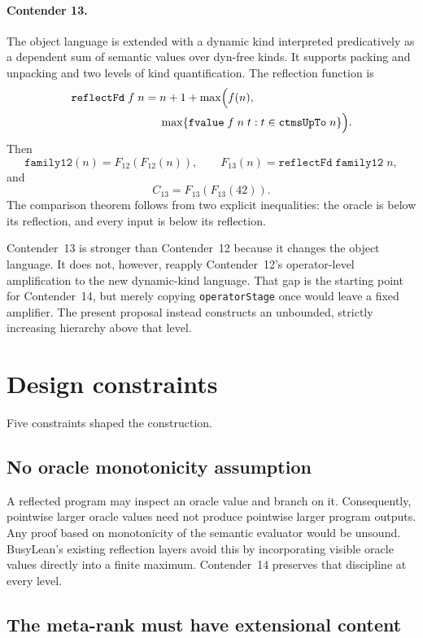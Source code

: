 \documentclass[11pt]{article}
\theoremstyle{definition}
\theoremstyle{remark}
\newcommand{\lean}[1]{\texttt{#1}}
\begin{document}
\paragraph{Contender 13.}
The object language is extended with a dynamic kind interpreted
predicatively as a dependent sum of semantic values over dyn-free kinds.  It
supports packing and unpacking and two levels of kind quantification.  The
reflection function is
\[
\begin{split}
\lean{reflectFd}\;f\;n
  ={}& n+1 + \max\Bigl(f(n),\\
     &\max\{\lean{fvalue}\;f\;n\;t :
       t\in\lean{ctmsUpTo}\;n\}\Bigr).
\end{split}
\]
Then
\[
  \lean{family12}(n)=F_{12}(F_{12}(n)),\qquad
  F_{13}(n)=\lean{reflectFd}\;\lean{family12}\;n,
\]
and
\[
  C_{13}=F_{13}(F_{13}(42)).
\]
The comparison theorem follows from two explicit inequalities: the oracle is
below its reflection, and every input is below its reflection.

Contender~13 is stronger than Contender~12 because it changes the object
language.  It does not, however, reapply Contender~12's operator-level
amplification to the new dynamic-kind language.  That gap is the starting point
for Contender~14, but merely copying \lean{operatorStage} once would leave a
fixed amplifier.  The present proposal instead constructs an unbounded,
strictly increasing hierarchy above that level.

\section{Design constraints}

Five constraints shaped the construction.

\subsection{No oracle monotonicity assumption}

A reflected program may inspect an oracle value and branch on it.  Consequently,
pointwise larger oracle values need not produce pointwise larger program
outputs.  Any proof based on monotonicity of the semantic evaluator would be
unsound.  BusyLean's existing reflection layers avoid this by incorporating
visible oracle values directly into a finite maximum.  Contender~14 preserves
that discipline at every level.

\subsection{The meta-rank must have extensional content}
\end{document}
